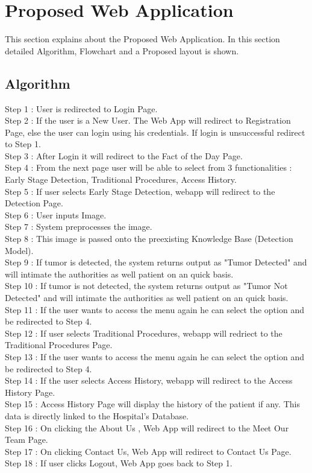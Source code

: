 
\section{Proposed Web Application}
This section explains about the Proposed Web Application. In this section detailed Algorithm, Flowchart and a Proposed layout is shown.
\subsection{Algorithm}
Step 1 : User is redirected to Login Page.\\
Step 2 : If the user is a New User. The Web App will redirect to Registration Page, else the user can login using his credentials. If login is unsuccessful redirect to Step 1.\\
Step 3 : After Login it will redirect to the Fact of the Day Page.\\
Step 4 : From the next page user will be able to select from 3 functionalities : Early Stage Detection, Traditional Procedures, Access History.\\
Step 5 : If user selects Early Stage Detection, webapp will redirect to the Detection Page. \\
Step 6 : User inputs Image.\\
Step 7 : System preprocesses the image.\\
Step 8 : This image is passed onto the preexisting Knowledge Base (Detection Model).\\
Step 9 : If tumor is detected, the system returns output as "Tumor Detected" and will intimate the authorities as well patient on an quick basis.\\
Step 10 : If tumor is not detected, the system returns output as "Tumor Not Detected" and will intimate the authorities as well patient on an quick basis.\\
Step 11 : If the user wants to access the menu again he can select the option and be redirected to Step 4.\\
Step 12 : If user selects Traditional Procedures, webapp will redriect to the Traditional Procedures Page.\\ 
Step 13 : If the user wants to access the menu again he can select the option and be redirected to Step 4.\\
Step 14 : If the user selects Access History, webapp will redirect to the Access History Page. \\
Step 15 : Access History Page will display the history of the patient if any. This data is directly linked to the Hospital's Database.\\
Step 16 : On clicking the About Us , Web App will redirect to the Meet Our Team Page.\\ 
Step 17 : On clicking Contact Us, Web App will redirect to Contact Us Page.\\ 
Step 18 : If user clicks Logout, Web App goes back to Step 1.\\

